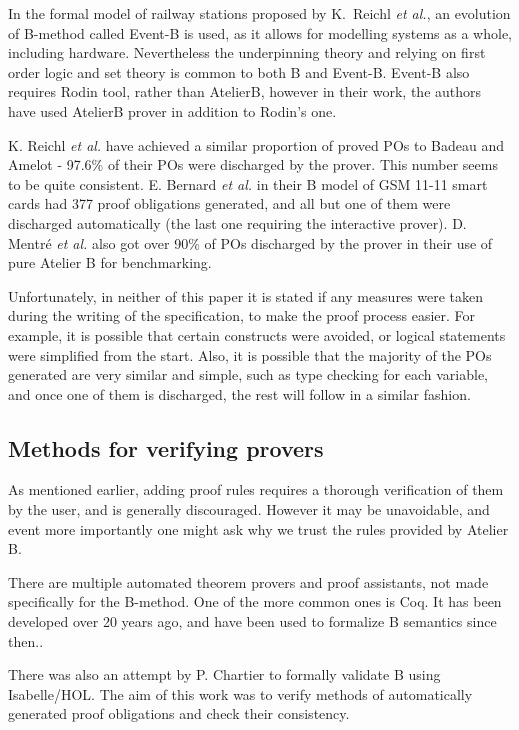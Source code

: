\documentclass[11pt,journal]{IEEEtran}
\begin{document}
	In the formal model of railway stations proposed by K.~Reichl \emph{et al.}\cite{Railway routing}, an evolution of B-method called Event-B is used, as it allows for modelling systems as a whole, including hardware. Nevertheless the underpinning theory and relying on first order logic and set theory is common to both B and Event-B. Event-B also requires Rodin tool, rather than AtelierB, however in their work, the authors have used AtelierB prover in addition to Rodin's one.
	
	K. Reichl \emph{et al.} have achieved a similar proportion of proved POs to Badeau and Amelot - 97.6\% of their POs were discharged  by the prover. This number seems to be quite consistent. E. Bernard \emph{et al.} in their B model of GSM 11-11 smart cards had 377 proof obligations generated, and all but one of them were discharged automatically (the last one requiring the interactive prover)\cite{GSM}. D. Mentr\'{e} \emph{et al.} also got over 90\% of POs discharged by the prover in their use of pure Atelier B for benchmarking.\cite{discharging}
	
	Unfortunately, in neither of this paper it is stated if any measures were taken during the writing of the specification, to make the proof process easier. For example, it is possible that certain constructs were avoided, or logical statements were simplified from the start. Also, it is possible that the majority of the POs generated are very similar and simple, such as type checking for each variable, and once one of them is discharged, the rest will follow in a similar fashion.
	
	
	\subsection{Methods for verifying provers}
	
	As mentioned earlier, adding proof rules requires a thorough verification of them by the user, and is generally discouraged. However it may be unavoidable, and event more importantly one might ask why we trust the rules provided by Atelier B. 
	
	There are multiple automated theorem provers and proof assistants, not made specifically for the B-method. One of the more common ones is Coq. It has been developed over 20 years ago, and have been used to formalize B semantics since then.\cite{Coq and PVS}.
	
	There was also an attempt by P. Chartier to formally validate B using Isabelle/HOL\cite{Isabelle}. The aim of this work was to verify methods of automatically generated proof obligations and check their consistency.
		
\end{document}
